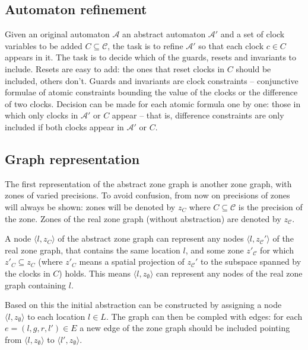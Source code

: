 

\subsection{Automaton refinement}

Given an original automaton $\mathcal{A}$ an abstract automaton $\mathcal{A'}$ and a set of clock variables to be added $C \subseteq \mathcal{C}$, the task is to refine $\mathcal{A'}$ so that each clock $c \in C$ appears in it. The task is to decide which of the guards, resets and invariants to include. Resets are easy to add: the ones that reset clocks in $C$ should be included, others don't. Guards and invariants are clock constraints -- conjunctive formulae of atomic constraints bounding the value of the clocks or the difference of two clocks. Decision can be made for each atomic formula one by one: those in which only clocks in $\mathcal{A'}$ or $C$ appear -- that is, difference constraints are only included if both clocks appear in $\mathcal{A'}$ or $C$.




\subsection{Graph representation} %
The first representation of the abstract zone graph is another zone graph, with zones of varied precisions. To avoid confusion, from now on precisions of zones will always be shown: zones will be denoted by $z_{C}$ where $C \subseteq \mathcal{C}$ is the precision of the zone. Zones of the real zone graph (without abstraction) are denoted by $z_{\mathcal{C}}$.

A node $\langle l, z_{C} \rangle$ of the abstract zone graph can represent any nodes $\langle l, z_{\mathcal{C}}' \rangle$ of the real zone graph, that contains the same location $l$, and some zone $z'_{\mathcal{C}}$ for which $z'_C \subseteq z_C$ (where $z'_C$ means a spatial projection of $z_{\mathcal{C}}'$ to the subspace spanned by the clocks in $C$) holds. This means $\langle l, z_{\emptyset} \rangle$ can represent any nodes of the real zone graph containing $l$. 

Based on this the initial abstraction can be constructed by assigning a node $\langle l, z_{\emptyset} \rangle$ to each location $l \in L$. The graph can then be compled with edges: for each $e=(l,g,r,l') \in E$ a new edge of the zone graph should be included pointing from $\langle l, z_{\emptyset} \rangle$ to $\langle l', z_{\emptyset} \rangle$.

